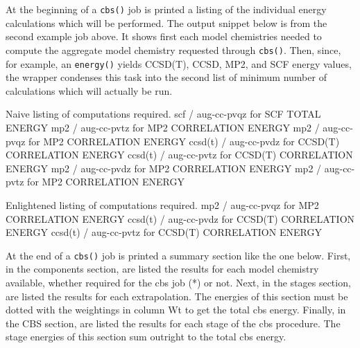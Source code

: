 
At the beginning of a \texttt{cbs()} job is printed a listing of the individual energy
calculations which will be performed. The output snippet below is from the second example
job above. It shows first each model chemistries
needed to compute the aggregate model chemistry requested through \texttt{cbs()}. Then,
since, for example, an \texttt{energy(\qq)} yields CCSD(T), CCSD, MP2, and SCF
energy values, the wrapper condenses this task into the second list of minimum number of
calculations which will actually be run.

\begin{Snippet}
    Naive listing of computations required.
            scf / aug-cc-pvqz              for  SCF TOTAL ENERGY
            mp2 / aug-cc-pvtz              for  MP2 CORRELATION ENERGY
            mp2 / aug-cc-pvqz              for  MP2 CORRELATION ENERGY
        ccsd(t) / aug-cc-pvdz              for  CCSD(T) CORRELATION ENERGY
        ccsd(t) / aug-cc-pvtz              for  CCSD(T) CORRELATION ENERGY
            mp2 / aug-cc-pvdz              for  MP2 CORRELATION ENERGY
            mp2 / aug-cc-pvtz              for  MP2 CORRELATION ENERGY

    Enlightened listing of computations required.
            mp2 / aug-cc-pvqz              for  MP2 CORRELATION ENERGY
        ccsd(t) / aug-cc-pvdz              for  CCSD(T) CORRELATION ENERGY
        ccsd(t) / aug-cc-pvtz              for  CCSD(T) CORRELATION ENERGY
\end{Snippet}

At the end of a \texttt{cbs()} job is printed a summary section like the one below. First,
in the components section, are listed the results for each model chemistry available, whether
required for the cbs job (*) or not. Next, in the stages section, are listed the results for
each extrapolation. The energies of this section must be dotted with the weightings in column Wt
to get the total cbs energy. Finally, in the CBS section, are listed the results for each stage
of the cbs procedure. The stage energies of this section sum outright to the total cbs energy.

